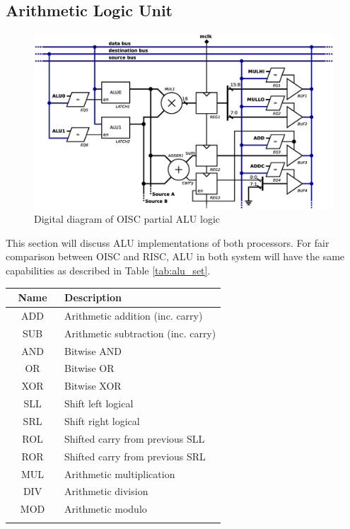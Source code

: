 \subsection{Arithmetic Logic Unit}\label{subsec:alu}

\begin{figure}[b]
\centering
\includegraphics[scale=0.35]{../resources/oisc_alu.eps}
\caption{Digital diagram of OISC partial ALU logic}
\label{fig:oisc_alu}
\end{figure}

This section will discuss ALU implementations of both processors. For fair comparison between OISC and RISC, ALU in both system will have the same capabilities as described in Table \ref{tab:alu_set}.

\begin{blockpage}
	\begin{tabular}{| c | p{0.75\linewidth} |} \hline 
		\rowcolor[rgb]{0.82,0.82,0.82}
		Name & Description \\\hline
		\arrayrulecolor[rgb]{0.82,0.82,0.82}
		ADD & Arithmetic addition (inc. carry) \\\hline
		SUB & Arithmetic subtraction (inc. carry) \\\hline
		AND & Bitwise AND \\\hline
		OR  & Bitwise OR \\\hline
		XOR & Bitwise XOR \\\hline
		SLL & Shift left logical \\\hline
		SRL & Shift right logical \\\hline
		ROL & Shifted carry from previous SLL \\\hline
		ROR & Shifted carry from previous SRL \\\hline
		MUL & Arithmetic multiplication \\\hline
		DIV & Arithmetic division \\\hline
		MOD & Arithmetic modulo \\
		\arrayrulecolor[rgb]{0,0,0}\hline
	\end{tabular}
	\label{tab:alu_set}
\end{blockpage}

